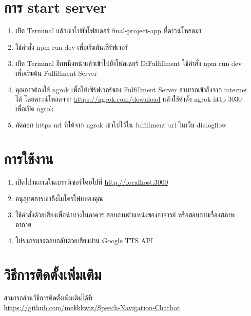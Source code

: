 \section{การ start server}

\begin{enumerate}
\item เปิด Terminal แล้วเข้าไปยังโฟลเดอร์ final-project-app ที่ดาวน์โหลดมา
\item ใช้คำสั่ง npm run dev เพื่อเริ่มต้นเซิร์ฟเวอร์
\item เปิด Terminal อีกหนึ่งหน้าแล้วเข้าไปยังโฟลเดอร์ DfFulfillment ใช้คำสั่ง npm run dev เพื่อเริ่มต้น Fulfillment Server
\item คุณอาจต้องใช้ ngrok เพื่อให้เซิร์ฟเวอร์ของ Fulfillment Server สามารถเข้าถึงจาก internet ได้ โดยดาวน์โหลดจาก \url{https://ngrok.com/download} แล้วใช้คำสั่ง ngrok http 3030 เพื่อเปิด ngrok
\item คัดลอก https url ที่ได้จาก ngrok เข้าไปไว้ใน fulfillment url ในเว็บ dialogflow
\end{enumerate}

\section{การใช้งาน}
\begin{enumerate}
\item เปิดโปรแกรมในเบราว์เซอร์โดยไปที่ \url{http://localhost:3000}
\item อนุญาตการเข้าถึงไมโครโฟนของคุณ
\item ใช้คำสั่งด้วยเสียงเพื่อนำทางในอาคาร สอบถามตำแหน่งของอาจารย์ หรือสอบถามเรื่องสภาพอากาศ
\item โปรแกรมจะตอบกลับด้วยเสียงผ่าน Google TTS API
\end{enumerate}

\section{วิธีการติดตั้งเพิ่มเติม}
สามารถอ่านวิธีการติดตั้งเพิ่มเติมได้ที่
\\\url{https://github.com/mekkkwiz/Speech-Navigation-Chatbot}
